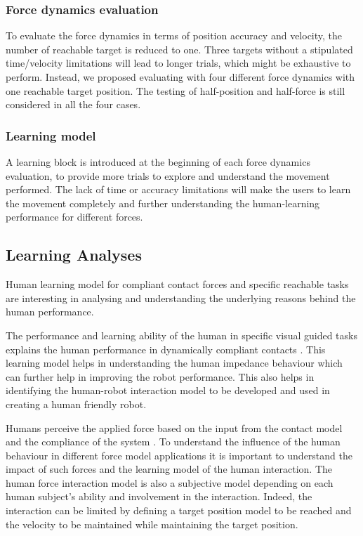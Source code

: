 \subsubsection{Force dynamics evaluation}
To evaluate the force dynamics in terms of position accuracy and velocity, the number of reachable target is reduced to one. Three targets without a stipulated time/velocity limitations will lead to longer trials, which might be exhaustive to perform.  Instead, we proposed evaluating with four different force dynamics with one reachable target position. The testing of half-position and half-force is still considered in all the four cases.

\subsubsection{Learning model}
A learning block is introduced at the beginning of each force dynamics evaluation, to provide more trials to explore and understand the movement performed. The lack of time or accuracy limitations will make the users to learn the movement completely and further understanding the human-learning performance for different forces.

\subsection{Learning Analyses}
Human learning model for compliant contact forces and specific reachable tasks are interesting in analysing and understanding the underlying reasons behind the human performance. 

The performance and learning ability of the human in specific visual guided tasks explains the human performance in dynamically compliant contacts \cite{ernst2002}. This learning model helps in understanding the human impedance behaviour which can further help in improving the robot performance. This also helps in identifying the human-robot interaction model to be developed and used in creating a human friendly robot. 

Humans perceive the applied force based on the input from the contact model and the compliance of the system \cite{pongrac2006}. To understand the influence of the human behaviour in different force model applications it is important to understand the impact of such forces and the learning model of the human interaction. The human force interaction model is also a subjective model depending on  each human subject’s ability and involvement in the interaction. Indeed, the interaction can be limited by defining a target position model to be reached and the velocity to be maintained while maintaining the target position.

